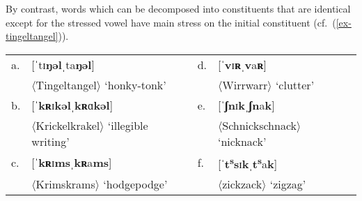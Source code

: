 \documentclass[output=paper
 ,nobabel
 ,draftmode
 ,colorlinks, citecolor=brown
]{langscibook}
\begin{document}





\noindent
By contrast, words which can be decomposed into constituents that are identical except for the stressed vowel have main stress on the initial constituent (cf.\ (\ref{ex-tingeltangel})).

\ea\label{ex-tingeltangel}
\begin{tabular}[t]{@{}l@{~}ll@{~}l@{}}
a. & [ˈtɪ\textbf{ŋəl}ˌta\textbf{ŋəl}]            & d. & {}[ˈ\textbf{v}ɪ\textbf{ʀ}ˌ\textbf{v}a\textbf{ʀ}]\\
   & $\langle$Tingeltangel$\rangle$ `honky-tonk' &    & $\langle$Wirrwarr$\rangle$ `clutter'\\[3pt]
b. & [ˈ\textbf{kʀ}ɪ\textbf{kəl}ˌ\textbf{kʀ}ɑ\textbf{kəl}] & e. & [ˈ\textbf{ʃn}ɪ\textbf{k}ˌ\textbf{ʃn}a\textbf{k}]\\
   & $\langle$Krickelkrakel$\rangle$ `illegible writing'  &    & $\langle$Schnickschnack$\rangle$ `nicknack'\\[3pt]
c. & [ˈ\textbf{kʀ}ɪ\textbf{ms}ˌ\textbf{kʀ}a\textbf{ms}]   & f. & [ˈ\textbf{t\textsuperscript{s}s}ɪ\textbf{k}ˌ\textbf{t\textsuperscript{s}}a\textbf{k}]\\
   & $\langle$Krimskrams$\rangle$ `hodgepodge'            &    & $\langle$zickzack$\rangle$ `zigzag'\\
\end{tabular}
\z
\end{document}
